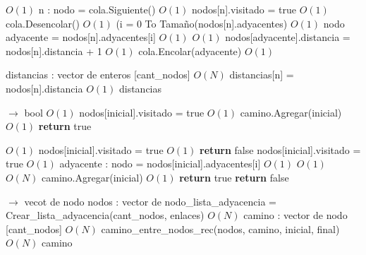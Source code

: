 \documentclass[a4paper, 10pt, twoside]{article}
\newenvironment{pseudo}[1][]{%
    \vspace{0.5em}%
    \begin{algorithmic}%
}
{%
    \end{algorithmic}%
    \vspace{0.5em}%
}
\newcommand{\Ode}[1]{\hfill $O(#1)$}
\begin{document}
\begin{pseudo}
                             \Ode{1}
    \State n : nodo = cola.Siguiente()                    \Ode{1}
    \State nodos[n].visitado = true                     \Ode{1}
    \State cola.Desencolar()                        \Ode{1}
    \For({i = 0 To Tamaño(nodos[n].adyacentes)}               \Ode{1}
      \State nodo adyacente = nodos[n].adyacentes[i]            \Ode{1}
                      \Ode{1}
        \State nodos[adyacente].distancia = nodos[n].distancia + 1    \Ode{1}
        \State cola.Encolar(adyacente)                  \Ode{1}
      \EndIf
    \EndFor
  \EndWhile

  \State distancias : vector de enteros [cant\_nodos]             \Ode{N}
    \State distancias[n] = nodos[n].distancia               \Ode{1}
  \EndFor
  \Return distancias
\EndProcedure

 $\rightarrow$ bool
                                 \Ode{1}
        \State nodos[inicial].visitado = true                   \Ode{1}
        \State camino.Agregar(inicial)                        \Ode{1}
        \State \textbf{return} true
    \EndIf

                       \Ode{1}
        \State nodos[inicial].visitado = true                   \Ode{1}
        \State \textbf{return} false
    \Else
        \State nodos[inicial].visitado = true                   \Ode{1}
          \State adyacente : nodo = nodos[inicial].adyacentes[i]          \Ode{1}
                                 \Ode{1}
                   \Ode{N}
                    \State camino.Agregar(inicial)                  \Ode{1}
                    \textbf{return} true
                \EndIf
            \EndIf
        \EndFor
        \State \textbf{return} false
    \EndIf
\EndProcedure

 $\rightarrow$ vecot de nodo
    \State nodos : vector de nodo\_lista\_adyacencia = Crear\_lista\_adyacencia(cant\_nodos, enlaces) \Ode{N}
    \State camino : vector de nodo [cant\_nodos]                      \Ode{N}
    \State camino\_entre\_nodos\_rec(nodos, camino, inicial, final)             \Ode{N}
    \Return camino
\EndProcedure



\end{pseudo}
\end{document}
